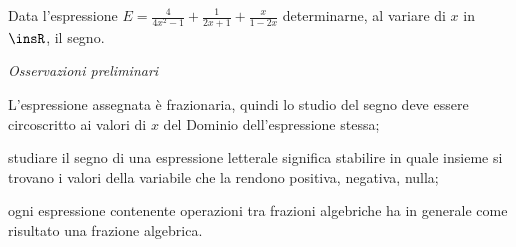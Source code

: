 \begin{esempio}
Data l'espressione $E=\frac 4{4x^2-1}+\frac 1{2x+1}+\frac x{1-2x}$ 
determinarne, 
al variare di $x$ in $\insR$, il segno.

\emph{Osservazioni preliminari}
\begin{itemize*}
\item L'espressione assegnata è frazionaria, quindi lo studio del segno deve 
essere circoscritto ai valori di $x$ del Dominio dell'espressione stessa;
\item studiare il segno di una espressione letterale significa stabilire in 
quale insieme si trovano i valori della variabile che la rendono positiva, 
negativa, nulla;
\item ogni espressione contenente operazioni tra frazioni algebriche ha in 
generale come risultato una frazione algebrica.
\end{itemize*}


\end{esempio}
